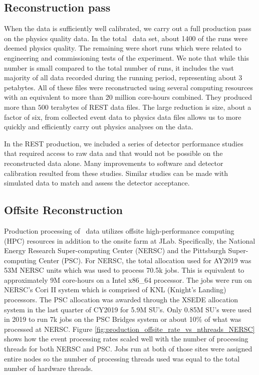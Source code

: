 \subsection{Reconstruction pass \label{sec:recreconstruction}}

When the data is sufficiently well calibrated, we carry out a full production pass on the physics quality data. In the total \GX~data set, about 1400 of the runs were deemed physics quality. The remaining were short runs which were related to engineering and commissioning tests of the experiment. We note that while this number is small compared to the total number of runs, it includes the vast majority of all data recorded during the running period, representing about 3 petabytes. All of these files were reconstructed using several computing resources with an equivalent to more than 20 million core-hours combined. They produced more than $500$ terabytes of REST data files. The large reduction is size, about a factor of six, from collected event data to physics data files allows us to  more quickly and efficiently carry out physics analyses on the data.

In the REST production, we included a series of detector performance studies that required access to raw data and that would not be possible on the reconstructed data alone. Many improvements to software and detector calibration resulted from these studies. Similar studies can be made with simulated data to match and assess the detector acceptance.

\subsection{Offsite Reconstruction}
\label{sec:recoffsite}

Production processing of \GX~data utilizes offsite high-performance computing (HPC) resources in addition to the onsite farm at JLab. Specifically, the National Energy Research Super-computing Center (NERSC) and the Pittsburgh Super-computing Center (PSC). For NERSC, the total allocation used for AY2019 was 53M NERSC units which was used to process 70.5k jobs. This is equivalent to approximately 9M core-hours on a Intel x86\_64 processor. The jobs were run on NERSC's Cori II system which is comprised of KNL (Knight's Landing) processors. The PSC allocation was awarded through the XSEDE allocation system in the last quarter of CY2019 for 5.9M SU's. Only 0.85M SU's were used in 2019 to run 7k jobs on the PSC Bridges system or about 10\% of what was processed at NERSC. Figure \ref{fig:production_offsite_rate_vs_nthreads_NERSC} shows how the event processing rates scaled well with the number of processing threads for both NERSC and PSC. Jobs run at both of those sites were assigned entire nodes so the number of processing threads used was equal to the total number of hardware threads.


